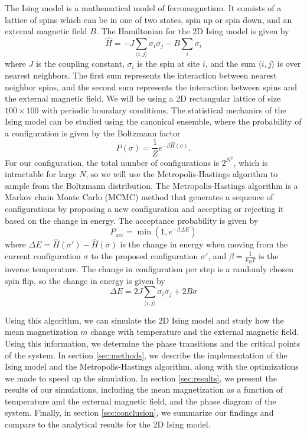 \documentclass[
 reprint,
 amsmath,
 amssymb,
 aps,
]{revtex4-2}
\begin{document}
The Ising model is a mathematical model of ferromagnetism.
It consists of a lattice of spins which can be in one of two states, 
spin up or spin down, and an external magnetic field $ B $.
The Hamiltonian for the 2D Ising model is given by 
\begin{equation}
\hat{H} = -J \sum_{\langle i,j \rangle} \sigma_{i} \sigma_{j}
- B \sum_i \sigma_{i}
\end{equation}
where $ J $ is the coupling constant, 
$ \sigma_i $ is the spin at site $ i $,
and the sum $ \langle i,j \rangle $ is over nearest neighbors.
The first sum represents the interaction between nearest neighbor spins,
and the second sum represents the interaction between spins and the external
magnetic field.
We will be using a 2D rectangular lattice of size $ 100\times 100 $ with 
periodic boundary conditions.
The statistical mechanics of the Ising model can be studied using the
canonical ensemble, where the probability of a configuration is given by the
Boltzmann factor
\begin{equation}
P(\sigma) = \frac{1}{Z} e^{-\beta \hat{H}(\sigma)}.
\end{equation}
For our configuration,
the total number of configurations is $ 2^{N^{2}} $,
which is intractable for large $ N $,
so we will use the Metropolis-Hastings algorithm to sample from the
Boltzmann distribution.
The Metropolis-Hastings algorithm is a Markov chain Monte Carlo (MCMC)
method that generates a sequence of configurations by proposing a new
configuration and accepting or rejecting it based on the change in energy.
The acceptance probability is given by
\begin{equation}
P_{acc} = \min\left(1, e^{-\beta \Delta E}\right) 
\end{equation}
where $ \Delta E = \hat{H}(\sigma') - \hat{H}(\sigma) $ 
is the change in energy
when moving from the current configuration $ \sigma $ to the proposed
configuration $ \sigma' $,
and $ \beta = \frac{1}{k_{B}T}$ is the inverse temperature.
The change in configuration per step is a randomly chosen spin flip,
so the change in energy is given by 
\begin{equation}
\Delta E = 2J \sum_{\langle i,j \rangle} \sigma_{i} \sigma_{j} + 2B \sigma 
\end{equation}

Using this algorithm, we can simulate the 2D Ising model and study how
the mean magnetization $ m $ change with temperature and the external magnetic
field. Using this information, we determine the phase transitions
and the critical points of the system.
In section \ref{sec:methods},
we describe the implementation of the Ising model and the Metropolis-Hastings
algorithm, along with the optimizations we made to speed up the simulation.
In section \ref{sec:results}, we present the results of our simulations,
including the mean magnetization as a function of temperature and the
external magnetic field, and the phase diagram of the system.
Finally, in section \ref{sec:conclusion}, we summarize our findings
and compare to the analytical results for the 2D Ising model.
\end{document}
